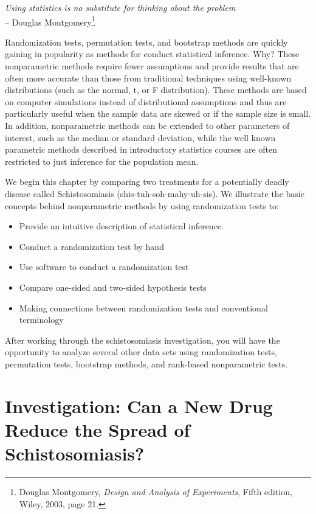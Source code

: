 \documentclass[
]{book}
\providecommand{\tightlist}{%
  \setlength{\itemsep}{0pt}\setlength{\parskip}{0pt}}
\begin{document}
\begin{flushright}
\emph{Using statistics is no substitute for thinking about the problem} \\
-- Douglas Montgomery\footnote{Douglas Montgomery, \emph{Design and Analysis of Experiments}, Fifth edition, Wiley, 2003, page 21.}
\end{flushright}

Randomization tests, permutation tests, and bootstrap methods are quickly gaining in popularity as methods for conduct statistical inference. Why? These nonparametric methods require fewer assumptions and provide results that are often more accurate than those from traditional techniques using well-known distributions (such as the normal, t, or F distribution). These methods are based on computer simulations instead of distributional assumptions and thus are particularly useful when the sample data are skewed or if the sample size is small. In addition, nonparametric methods can be extended to other parameters of interest, such as the median or standard deviation, while the well known parametric methods described in introductory statistics courses are often restricted to just inference for the population mean.

We begin this chapter by comparing two treatments for a potentially deadly disease called Schistosomiasis (shis-tuh-soh-mahy-uh-sis). We illustrate the basic concepts behind nonparametric methods by using randomization tests to:

\begin{itemize}
\tightlist
\item
  Provide an intuitive description of statistical inference.
\item
  Conduct a randomization test by hand
\item
  Use software to conduct a randomization test
\item
  Compare one-sided and two-sided hypothesis tests
\item
  Making connections between randomization tests and conventional terminology
\end{itemize}

After working through the schistosomiasis investigation, you will have the opportunity to analyze several other data sets using randomization tests, permutation tests, bootstrap methods, and rank-based nonparametric tests.

\newpage

\hypertarget{investigation-can-a-new-drug-reduce-the-spread-of-schistosomiasis}{%
\section{Investigation: Can a New Drug Reduce the Spread of Schistosomiasis?}\label{investigation-can-a-new-drug-reduce-the-spread-of-schistosomiasis}}
\end{document}

